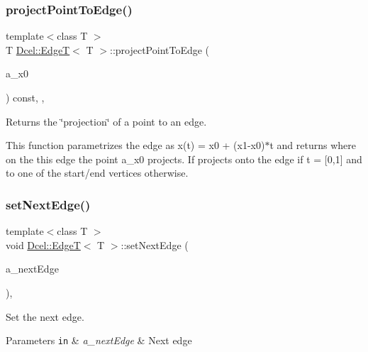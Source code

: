 \subsubsection{\texorpdfstring{project\+Point\+To\+Edge()}{projectPointToEdge()}}
{\footnotesize\ttfamily template$<$class T $>$ \\
T \hyperlink{classDcel_1_1EdgeT}{Dcel\+::\+EdgeT}$<$ T $>$\+::project\+Point\+To\+Edge (\begin{DoxyParamCaption}\item[{const \hyperlink{classDcel_1_1EdgeT_a93b8679cea557c419af44385ca6d356a}{Vec3} \&}]{a\+\_\+x0 }\end{DoxyParamCaption}) const\hspace{0.3cm}{\ttfamily [inline]}, {\ttfamily [protected]}, {\ttfamily [noexcept]}}



Returns the \char`\"{}projection\char`\"{} of a point to an edge. 

This function parametrizes the edge as x(t) = x0 + (x1-\/x0)$\ast$t and returns where on the this edge the point a\+\_\+x0 projects. If projects onto the edge if t = \mbox{[}0,1\mbox{]} and to one of the start/end vertices otherwise. \mbox{\label{classDcel_1_1EdgeT_aeeda5324a62f1d8b6e50d788907526bf}} 
\subsubsection{\texorpdfstring{set\+Next\+Edge()}{setNextEdge()}}
{\footnotesize\ttfamily template$<$class T $>$ \\
void \hyperlink{classDcel_1_1EdgeT}{Dcel\+::\+EdgeT}$<$ T $>$\+::set\+Next\+Edge (\begin{DoxyParamCaption}\item[{const \hyperlink{classDcel_1_1EdgeT_af525f4228d820f6b8b23fc02d937e4c8}{Edge\+Ptr} \&}]{a\+\_\+next\+Edge }\end{DoxyParamCaption})\hspace{0.3cm}{\ttfamily [inline]}, {\ttfamily [noexcept]}}



Set the next edge. 


\begin{DoxyParams}[1]{Parameters}
\mbox{\tt in}  & {\em a\+\_\+next\+Edge} & Next edge \\
\hline
\end{DoxyParams}
\mbox{\label{classDcel_1_1EdgeT_ab9ef2366cf1d411444caf81d5159a3e1}} 
